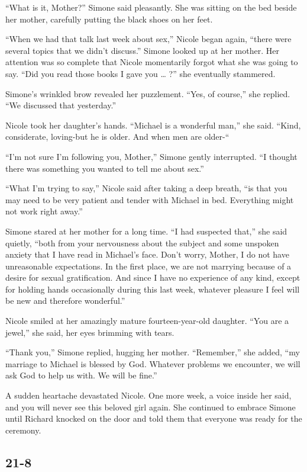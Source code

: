 \documentclass[]{article}
\begin{document}
{“What is it, Mother?” Simone said pleasantly. She was sitting on the bed beside her mother, carefully putting the black shoes on her feet.

“When we had that talk last week about sex,” Nicole began again, “there were several topics that we didn’t discuss.” Simone looked up at her mother. Her attention was so complete that Nicole momentarily forgot what she was going to say. “Did you read those books I gave you … ?” she eventually stammered.

Simone’s wrinkled brow revealed her puzzlement. “Yes, of course,” she replied. “We discussed that yesterday.”

Nicole took her daughter’s hands. “Michael is a wonderful man,” she said. “Kind, considerate, loving-but he is older. And when men are older-“

“I’m not sure I’m following you, Mother,” Simone gently interrupted. “I thought there was something you wanted to tell me about sex.”

“What I’m trying to say,” Nicole said after taking a deep breath, “is that you may need to be very patient and tender with Michael in bed. Everything might not work right away.”

Simone stared at her mother for a long time. “I had suspected that,” she said quietly, “both from your nervousness about the subject and some unspoken anxiety that I have read in Michael’s face. Don’t worry, Mother, I do not have unreasonable expectations. In the first place, we are not marrying because of a desire for sexual gratification. And since I have no experience of any kind, except for holding hands occasionally during this last week, whatever pleasure I feel will be new and therefore wonderful.”

Nicole smiled at her amazingly mature fourteen-year-old daughter. “You are a jewel,” she said, her eyes brimming with tears.

“Thank you,” Simone replied, hugging her mother. “Remember,” she added, “my marriage to Michael is blessed by God. Whatever problems we encounter, we will ask God to help us with. We will be fine.”

A sudden heartache devastated Nicole. One more week, a voice inside her said, and you will never see this beloved girl again. She continued to embrace Simone until Richard knocked on the door and told them that everyone was ready for the ceremony.

\subsection{21-8}

}
\end{document}

